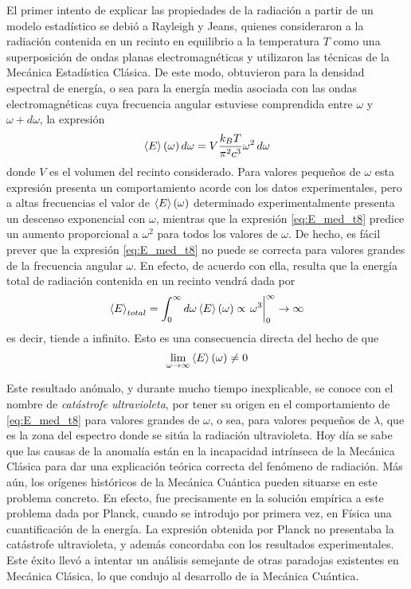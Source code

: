 El primer intento de explicar las propiedades de la radiación a partir de un modelo estadístico se debió a Rayleigh y Jeans, quienes consideraron a la radiación contenida en un recinto en equilibrio a la temperatura $T$ como una superposición de ondas planas electromagnéticas y utilizaron las técnicas de la Mecánica Estadística Clásica.
De este modo, obtuvieron para la densidad espectral de energía, o sea para la energía media asociada con las ondas electromagnéticas cuya frecuencia angular estuviese comprendida entre $\omega$ y $\omega + d\omega$, la expresión
\begin{equation}\label{eq:E_med_t8}
	\expval{E}(\omega) \dd{\omega}= V \frac{k_B T}{\pi^2 c^3} \omega^2 \dd{\omega}
\end{equation}
donde $V$ es el volumen del recinto considerado. Para valores pequeños de $\omega$ esta expresión presenta un comportamiento acorde con los datos experimentales, pero a altas frecuencias el valor de $\expval{E}(\omega)$ determinado experimentalmente presenta un descenso exponencial con $\omega$, mientras que la expresión \eqref{eq:E_med_t8} predice un aumento proporcional a $\omega^2$ para todos los valores de $\omega$.
De hecho, es fácil prever que la expresión \eqref{eq:E_med_t8} no puede se correcta para valores grandes de la frecuencia angular $\omega$. En efecto, de acuerdo con ella, resulta que la energía total de radiación contenida en un recinto vendrá dada por
\begin{equation}\label{eq:E_tot_t8}
	\expval{E}_{total} =\int_{0}^{\infty} \dd{\omega} \expval{E}(\omega) \propto \eval{\omega^3}_{0}^{\infty} \rightarrow \infty
\end{equation}
es decir, tiende a infinito. Esto es una consecuencia directa del hecho de que
\begin{equation}
	\lim\limits_{\omega\rightarrow\infty} \expval{E}(\omega) \neq 0
\end{equation}

Este resultado anómalo, y durante mucho tiempo inexplicable, se conoce con el nombre de \emph{catástrofe ultravioleta}, por tener su origen en el comportamiento de \eqref{eq:E_med_t8} para valores grandes de $\omega$, o sea, para valores pequeños de $\lambda$, que es la zona del espectro donde se sitúa la radiación ultravioleta.
Hoy día se sabe que las causas de la anomalía están en la incapacidad intrínseca de la Mecánica Clásica para dar una explicación teórica correcta del fenómeno de radiación.
Más aún, los orígenes históricos de la Mecánica Cuántica pueden situarse en este problema concreto.
En efecto, fue precisamente en la solución empírica a este problema dada por Planck, cuando se introdujo por primera vez, en Física una cuantificación de la energía. 
La expresión obtenida por Planck no presentaba la catástrofe ultravioleta, y además concordaba con los resultados experimentales. Este éxito llevó a intentar un análisis semejante de otras paradojas existentes en Mecánica Clásica, lo que condujo al desarrollo de ia Mecánica Cuántica.

